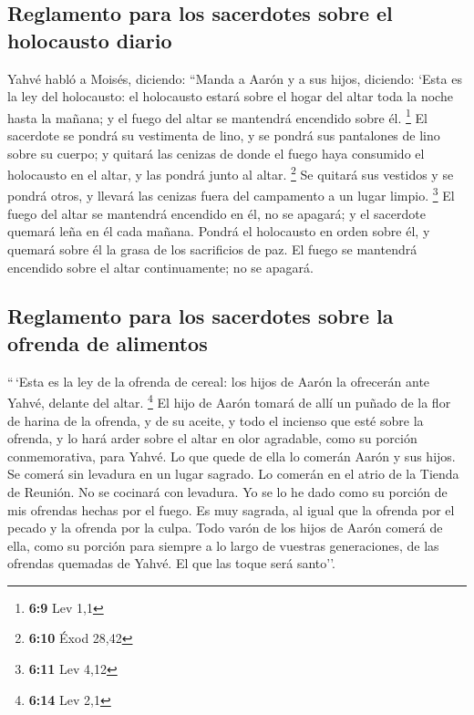 \begin{paracol}{2}
\hypertarget{reglamento-para-los-sacerdotes-sobre-el-holocausto-diario}{%
\subsection{Reglamento para los sacerdotes sobre el holocausto
diario}\label{reglamento-para-los-sacerdotes-sobre-el-holocausto-diario}}

 Yahvé habló a Moisés, diciendo:  ``Manda a
Aarón y a sus hijos, diciendo: `Esta es la ley del holocausto: el
holocausto estará sobre el hogar del altar toda la noche hasta la
mañana; y el fuego del altar se mantendrá encendido sobre él.
\footnote{\textbf{6:9} Lev 1,1}  El sacerdote se pondrá
su vestimenta de lino, y se pondrá sus pantalones de lino sobre su
cuerpo; y quitará las cenizas de donde el fuego haya consumido el
holocausto en el altar, y las pondrá junto al altar. \footnote{\textbf{6:10}
  Éxod 28,42}  Se quitará sus vestidos y se pondrá otros,
y llevará las cenizas fuera del campamento a un lugar limpio.
\footnote{\textbf{6:11} Lev 4,12}  El fuego del altar se
mantendrá encendido en él, no se apagará; y el sacerdote quemará leña en
él cada mañana. Pondrá el holocausto en orden sobre él, y quemará sobre
él la grasa de los sacrificios de paz.  El fuego se
mantendrá encendido sobre el altar continuamente; no se apagará.

\hypertarget{reglamento-para-los-sacerdotes-sobre-la-ofrenda-de-alimentos}{%
\subsection{Reglamento para los sacerdotes sobre la ofrenda de
alimentos}\label{reglamento-para-los-sacerdotes-sobre-la-ofrenda-de-alimentos}}

 ``\,`Esta es la ley de la ofrenda de cereal: los hijos
de Aarón la ofrecerán ante Yahvé, delante del altar. \footnote{\textbf{6:14}
  Lev 2,1}  El hijo de Aarón tomará de allí un puñado de
la flor de harina de la ofrenda, y de su aceite, y todo el incienso que
esté sobre la ofrenda, y lo hará arder sobre el altar en olor agradable,
como su porción conmemorativa, para Yahvé.  Lo que quede
de ella lo comerán Aarón y sus hijos. Se comerá sin levadura en un lugar
sagrado. Lo comerán en el atrio de la Tienda de Reunión. 
No se cocinará con levadura. Yo se lo he dado como su porción de mis
ofrendas hechas por el fuego. Es muy sagrada, al igual que la ofrenda
por el pecado y la ofrenda por la culpa.  Todo varón de
los hijos de Aarón comerá de ella, como su porción para siempre a lo
largo de vuestras generaciones, de las ofrendas quemadas de Yahvé. El
que las toque será santo''.


\end{paracol}
